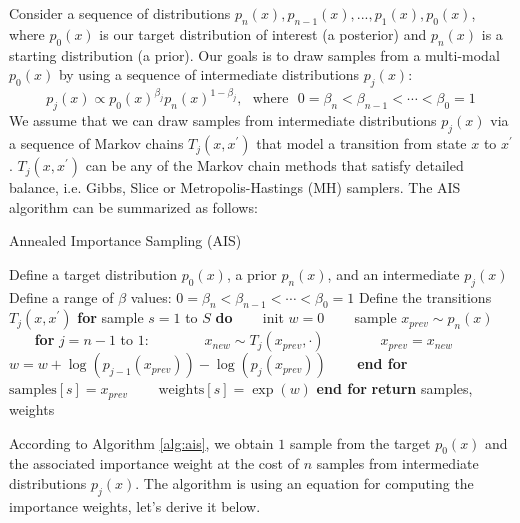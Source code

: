 Consider a sequence of distributions $p_n(x), p_{n-1}(x),...,p_1(x), p_0(x)$, where $p_0(x)$ is our target distribution of interest (a posterior) and $p_n(x)$ is a starting distribution (a prior). Our goals is to draw samples from a multi-modal $p_0(x)$ by using a sequence of intermediate distributions $p_j(x)$:
\begin{equation}
    p_j(x) \propto p_0(x)^{\beta_j}p_n(x)^{1-\beta_j},~~~\mathrm{where}~~~ 0 = \beta_n < \beta_{n-1} < \cdots < \beta_{0} = 1
\end{equation}
We assume that we can draw samples from intermediate distributions $p_j(x)$ via a sequence of Markov chains $T_j(x, x^{\prime})$ that model a transition from state $x$ to $x^{\prime}$. $T_j(x, x^{\prime})$ can be any of the Markov chain methods that satisfy detailed balance, i.e. Gibbs, Slice or Metropolis-Hastings (MH) samplers. The AIS algorithm can be summarized as follows:

\begin{algorithm}
\caption{Annealed Importance Sampling (AIS) \cite{Neal1998}}
\label{alg:ais}
\begin{algorithmic}[1]
\STATE Define a target distribution $p_0(x)$, a prior $p_n(x)$, and an intermediate $p_j(x)$ 
\STATE Define a range of $\beta$ values: $0 = \beta_n < \beta_{n-1} < \cdots < \beta_{0} = 1$
\STATE Define the transitions $T_j(x,x^{\prime})$ 
\STATE \textbf{for} sample $s = 1$ to $S$ \textbf{do} 
\STATE ~~~ init $w = 0$
\STATE ~~~ sample $x_{prev} \sim p_n(x)$
\STATE ~~~ \textbf{for} $j=n-1$ to $1$:
\STATE ~~~ ~~~ $x_{new} \sim T_j(x_{prev}, \cdot)$ 
\STATE ~~~ ~~~ $x_{prev} = x_{new}$
\STATE ~~~ ~~~ $w = w + \log(p_{j-1}(x_{prev})) - \log(p_{j}(x_{prev}))$
\STATE ~~~ \textbf{end for}
\STATE ~~~ $\mathrm{samples}[s] = x_{prev}$
\STATE ~~~ $\mathrm{weights}[s] = \exp(w)$
\STATE \textbf{end for}
\STATE \textbf{return} samples, weights
\end{algorithmic}
\end{algorithm}
According to Algorithm \ref{alg:ais}, we obtain $1$ sample from the target $p_0(x)$ and the associated importance weight at the cost of $n$ samples from intermediate distributions $p_j(x)$. The algorithm is using an equation for computing the importance weights, let's derive it below.\\

